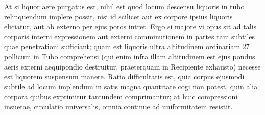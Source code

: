 \newpage
[101 v\textsuperscript{o}] At si liquor aere purgatus est, nihil est quod locum descensu  liquoris in tubo relinquendum implere possit, nisi id scilicet aut ex corpore ipsius liquoris eliciatur, aut ab externo per ejus  poros intret. Ergo si majore vi opus sit ad  talis corporis interni expressionem aut externi comminutionem  in partes tam subtiles quae penetrationi sufficiant;  quam est liquoris ultra altitudinem ordinariam  27 pollicum in Tubo comprehensi (qui enim  infra illam altitudinem est ejus pondus aeris externi aequipondio destruitur, praeterquam in Recipiente exhausto)  necesse est liquorem suspensum manere. Ratio difficultatis  est, quia corpus ejusmodi subtile ad locum implendum  in satis magna quantitate cogi non potest, quin  alia corpora quibus exprimitur tantundem comprimantur;  at huic compressioni insuetae, circulatio universalis,  omnia continue ad uniformitatem  resistit. %
